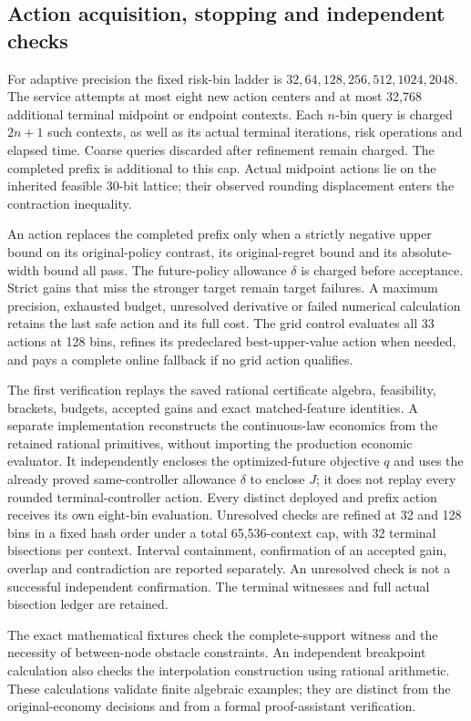 \subsection{Action acquisition, stopping and independent checks}

For adaptive precision the fixed risk-bin ladder is
$32,64,128,256,512,1024,2048$. The service attempts at most eight
new action centers and at most 32,768 additional terminal midpoint or
endpoint contexts. Each $n$-bin query is charged $2n+1$ such contexts,
as well as its actual terminal iterations, risk operations and elapsed
time. Coarse queries discarded after refinement remain charged. The
completed prefix is additional to this cap. Actual midpoint actions lie on
the inherited feasible 30-bit lattice; their observed rounding displacement
enters the contraction inequality.

An action replaces the completed prefix only when a strictly negative
upper bound on its original-policy contrast, its original-regret bound and
its absolute-width bound all pass. The future-policy allowance $\delta$
is charged before acceptance. Strict gains that miss the stronger target
remain target failures. A maximum precision, exhausted budget, unresolved
derivative or failed numerical calculation retains the last safe action and
its full cost. The grid control evaluates all 33 actions at 128 bins,
refines its predeclared best-upper-value action when needed, and pays a
complete online fallback if no grid action qualifies.

The first verification replays the saved rational certificate algebra,
feasibility, brackets, budgets, accepted gains and exact matched-feature
identities. A separate implementation reconstructs the continuous-law
economics from the retained rational primitives, without importing the
production economic evaluator. It independently encloses the optimized-future
objective $q$ and uses the already proved same-controller allowance $\delta$
to enclose $J$; it does not replay every rounded terminal-controller action.
Every distinct deployed and prefix action
receives its own eight-bin evaluation. Unresolved checks are refined at
32 and 128 bins in a fixed hash order under a total 65,536-context cap,
with 32 terminal bisections per context. Interval containment, confirmation
of an accepted gain, overlap and contradiction are reported separately.
An unresolved check is not a successful independent confirmation. The
terminal witnesses and full actual bisection ledger are retained.

The exact mathematical fixtures check the complete-support witness and
the necessity of between-node obstacle constraints. An independent
breakpoint calculation also checks the interpolation construction using
rational arithmetic. These calculations validate finite algebraic examples;
they are distinct from the original-economy decisions and from a formal
proof-assistant verification.

